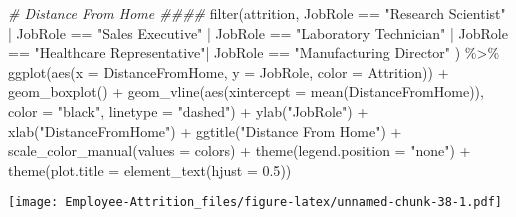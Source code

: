 \documentclass[
]{article}
\newenvironment{Shaded}{\begin{snugshade}}{\end{snugshade}}
\newcommand{\AttributeTok}[1]{\textcolor[rgb]{0.77,0.63,0.00}{#1}}
\newcommand{\CommentTok}[1]{\textcolor[rgb]{0.56,0.35,0.01}{\textit{#1}}}
\newcommand{\FloatTok}[1]{\textcolor[rgb]{0.00,0.00,0.81}{#1}}
\newcommand{\FunctionTok}[1]{\textcolor[rgb]{0.00,0.00,0.00}{#1}}
\newcommand{\NormalTok}[1]{#1}
\newcommand{\SpecialCharTok}[1]{\textcolor[rgb]{0.00,0.00,0.00}{#1}}
\newcommand{\StringTok}[1]{\textcolor[rgb]{0.31,0.60,0.02}{#1}}
\begin{document}
\begin{Shaded}
\begin{Highlighting}[]
\CommentTok{\# Distance From Home \#\#\#\#}
\FunctionTok{filter}\NormalTok{(attrition, JobRole }\SpecialCharTok{==} \StringTok{"Research Scientist"} \SpecialCharTok{|}\NormalTok{ JobRole }\SpecialCharTok{==} \StringTok{"Sales Executive"}  \SpecialCharTok{|}\NormalTok{ JobRole }\SpecialCharTok{==} \StringTok{"Laboratory Technician"} \SpecialCharTok{|}\NormalTok{ JobRole }\SpecialCharTok{==} \StringTok{"Healthcare Representative"}\SpecialCharTok{|}\NormalTok{ JobRole }\SpecialCharTok{==} \StringTok{"Manufacturing Director"}\NormalTok{ ) }\SpecialCharTok{\%\textgreater{}\%}
  \FunctionTok{ggplot}\NormalTok{(}\FunctionTok{aes}\NormalTok{(}\AttributeTok{x =}\NormalTok{ DistanceFromHome, }\AttributeTok{y =}\NormalTok{ JobRole, }\AttributeTok{color =}\NormalTok{ Attrition)) }\SpecialCharTok{+}
  \FunctionTok{geom\_boxplot}\NormalTok{() }\SpecialCharTok{+}
  \FunctionTok{geom\_vline}\NormalTok{(}\FunctionTok{aes}\NormalTok{(}\AttributeTok{xintercept =} \FunctionTok{mean}\NormalTok{(DistanceFromHome)), }\AttributeTok{color =} \StringTok{"black"}\NormalTok{, }\AttributeTok{linetype =} \StringTok{"dashed"}\NormalTok{) }\SpecialCharTok{+}
  \FunctionTok{ylab}\NormalTok{(}\StringTok{"JobRole"}\NormalTok{) }\SpecialCharTok{+}
  \FunctionTok{xlab}\NormalTok{(}\StringTok{"DistanceFromHome"}\NormalTok{) }\SpecialCharTok{+}
  \FunctionTok{ggtitle}\NormalTok{(}\StringTok{"Distance From Home"}\NormalTok{) }\SpecialCharTok{+}
  \FunctionTok{scale\_color\_manual}\NormalTok{(}\AttributeTok{values =}\NormalTok{ colors) }\SpecialCharTok{+}
  \FunctionTok{theme}\NormalTok{(}\AttributeTok{legend.position =} \StringTok{"none"}\NormalTok{) }\SpecialCharTok{+}
  \FunctionTok{theme}\NormalTok{(}\AttributeTok{plot.title =} \FunctionTok{element\_text}\NormalTok{(}\AttributeTok{hjust =} \FloatTok{0.5}\NormalTok{)) }
\end{Highlighting}
\end{Shaded}

\texttt{[image: Employee-Attrition\_files/figure-latex/unnamed-chunk-38-1.pdf]}
\end{document}
